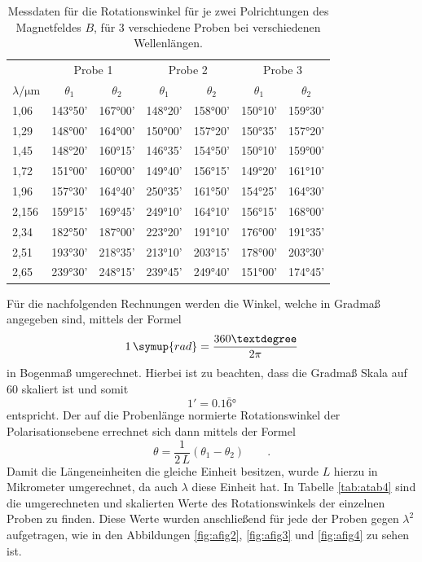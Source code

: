 \FloatBarrier
\begin{table}[h]
    \centering
    \caption{Messdaten für die Rotationswinkel für je zwei Polrichtungen des Magnetfeldes $B$, für 3 verschiedene Proben bei verschiedenen Wellenlängen.}
    \label{tab:atab3}
    \begin{tabular}{l c c c c c c}
        \toprule
        & \multicolumn{2}{c}{Probe 1} & \multicolumn{2}{c}{Probe 2} & \multicolumn{2}{c}{Probe 3} \\
        \cmidrule(lr){2-3}\cmidrule(lr){4-5}\cmidrule(lr){6-7}
        {$\lambda / \si{\micro\meter}$} & {$\theta_1$} & {$\theta_2$} & {$\theta_1$} & {$\theta_2$} & {$\theta_1$} & {$\theta_2$} \\
        \midrule

        1,06 & 143°50' & 167°00' & 148°20' & 158°00' & 150°10' & 159°30' \\
        1,29 & 148°00' & 164°00' & 150°00' & 157°20' & 150°35' & 157°20' \\
        1,45 & 148°20' & 160°15' & 146°35' & 154°50' & 150°10' & 159°00' \\
        1,72 & 151°00' & 160°00' & 149°40' & 156°15' & 149°20' & 161°10' \\
        1,96 & 157°30' & 164°40' & 250°35' & 161°50' & 154°25' & 164°30' \\
        2,156& 159°15' & 169°45' & 249°10' & 164°10' & 156°15' & 168°00' \\
        2,34 & 182°50' & 187°00' & 223°20' & 191°10' & 176°00' & 191°35' \\
        2,51 & 193°30' & 218°35' & 213°10' & 203°15' & 178°00' & 203°30' \\
        2,65 & 239°30' & 248°15' & 239°45' & 249°40' & 151°00' & 174°45' \\

        \bottomrule
    \end{tabular}
\end{table}
\FloatBarrier
\noindent

Für die nachfolgenden Rechnungen werden die Winkel, welche in Gradmaß angegeben sind, mittels der Formel
\begin{equation}
    1\, \symup{rad} = \frac{360°}{2\pi}
\end{equation}
in Bogenmaß umgerechnet. Hierbei ist zu beachten, dass die Gradmaß Skala auf $60$ skaliert ist und somit
\begin{equation*}
    1' = 0.1\bar{6}°
\end{equation*}
entspricht. Der auf die Probenlänge normierte Rotationswinkel der Polarisationsebene errechnet sich dann mittels der Formel
\begin{equation}
    \theta = \frac{1}{2\, L}(\theta_1 - \theta_2) \qquad .
\end{equation}
Damit die Längeneinheiten die gleiche Einheit besitzen, wurde $L$ hierzu in Mikrometer umgerechnet, da auch $\lambda$ diese Einheit hat.
In Tabelle \ref{tab:atab4} sind die umgerechneten und skalierten Werte des Rotationswinkels der einzelnen Proben zu finden. Diese Werte wurden anschließend für jede der Proben gegen $\lambda^2$ 
aufgetragen, wie in den Abbildungen \ref{fig:afig2}, \ref{fig:afig3} und \ref{fig:afig4} zu sehen ist.

